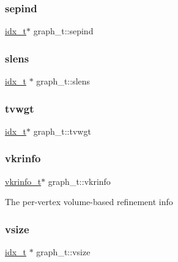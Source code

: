 \subsubsection{\texorpdfstring{sepind}{sepind}}
{\footnotesize\ttfamily \hyperlink{3rd_party_2parmetis-4_80_83_2metis_2include_2metis_8h_aaa5262be3e700770163401acb0150f52}{idx\+\_\+t}$\ast$ graph\+\_\+t\+::sepind}

\mbox{\label{structgraph__t_a743f336965c7805d60a8ed4875cd208d}} 
\subsubsection{\texorpdfstring{slens}{slens}}
{\footnotesize\ttfamily \hyperlink{3rd_party_2parmetis-4_80_83_2metis_2include_2metis_8h_aaa5262be3e700770163401acb0150f52}{idx\+\_\+t} $\ast$ graph\+\_\+t\+::slens}

\mbox{\label{structgraph__t_ace9ad621f1e97e5a796c8d24a345aef8}} 
\subsubsection{\texorpdfstring{tvwgt}{tvwgt}}
{\footnotesize\ttfamily \hyperlink{3rd_party_2parmetis-4_80_83_2metis_2include_2metis_8h_aaa5262be3e700770163401acb0150f52}{idx\+\_\+t}$\ast$ graph\+\_\+t\+::tvwgt}

\mbox{\label{structgraph__t_a65c5b927198432cf7e6c9314eb10e5c8}} 
\subsubsection{\texorpdfstring{vkrinfo}{vkrinfo}}
{\footnotesize\ttfamily \hyperlink{structvkrinfo__t}{vkrinfo\+\_\+t}$\ast$ graph\+\_\+t\+::vkrinfo}

The per-\/vertex volume-\/based refinement info \mbox{\label{structgraph__t_ad191f54e22012bbc3c7cc5fec228c71a}} 
\subsubsection{\texorpdfstring{vsize}{vsize}}
{\footnotesize\ttfamily \hyperlink{3rd_party_2parmetis-4_80_83_2metis_2include_2metis_8h_aaa5262be3e700770163401acb0150f52}{idx\+\_\+t} $\ast$ graph\+\_\+t\+::vsize}

